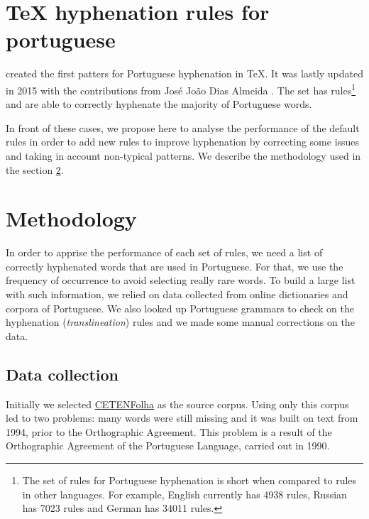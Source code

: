 \documentclass{article}
\begin{document}
\section{\TeX{} hyphenation rules for portuguese}\label{sec-tex-hyphen-pt}

\cite{rezende1987} created the first patters for Portuguese hyphenation in
\TeX{}. It was lastly updated in 2015 with the contributions from José João
Dias Almeida \cite{hyphpt}. The set has \NumberOfDefaultRules{}
rules\footnote{The set of rules for Portuguese hyphenation is short when
compared to rules in other languages. For example, English currently has 4938
rules, Russian has 7023 rules and German has 34011 rules.} and are able to
correctly hyphenate the majority of Portuguese words. 

In front of these cases, we propose here to analyse the performance of the default rules in order to add new rules to improve
hyphenation by correcting some issues and taking in account non-typical
patterns. We describe the methodology used in the section \ref{sec-methodology}.

\section{Methodology}\label{sec-methodology}

In order to apprise the performance of each set of rules, we need a list of
correctly hyphenated words that are used in Portuguese. For that, we use the
frequency of occurrence to avoid selecting really rare words. To build a large
list with such information, we relied on data collected from online
dictionaries and corpora of Portuguese. We also looked up Portuguese grammars
to check on the hyphenation (\emph{translineation}) rules and we made some manual
corrections on the data.


\subsection{Data collection}\label{sec-data-coll} 

Initially we selected \href{https://www.linguateca.pt/cetenfolha/index_info.html}{CETENFolha} 
as the source corpus. Using only this corpus led to two problems: many words
were still missing and it was built on text from 1994, prior to the
Orthographic Agreement. This problem is a result of the Orthographic Agreement
of the Portuguese Language, carried out in 1990. 
\end{document}
